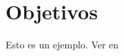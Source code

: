 \chapter{Objetivos}
\label{cap:objetivos}

Esto es un ejemplo. Ver en  \cite{darwin2009origen} \cite{del1984luces}